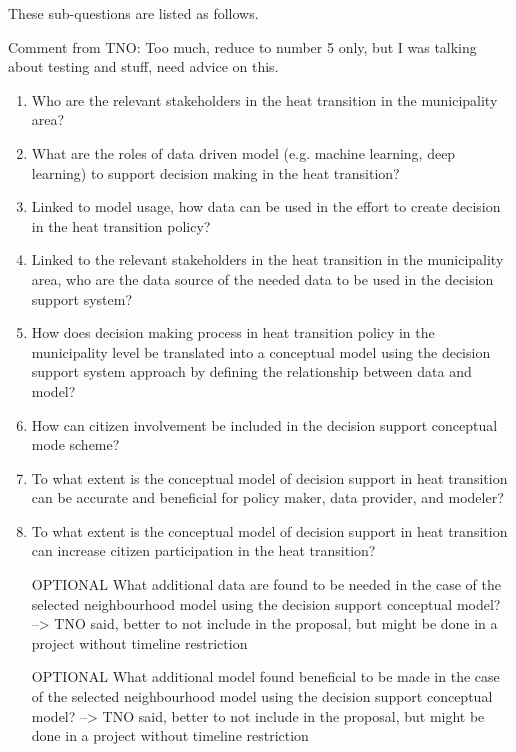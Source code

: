 These sub-questions are listed as follows.

Comment from TNO: Too much, reduce to number 5 only, but I was talking about testing and stuff, need advice on this.

\begin{enumerate}



    \item Who are the relevant stakeholders in the heat transition in the municipality area?
    \item What are the roles of data driven model (e.g. machine learning, deep learning) to support decision making in the heat transition?
    \item Linked to model usage, how data can be used in the effort to create decision in the heat transition policy?
    \item Linked to the relevant stakeholders in the heat transition in the municipality area, who are the data source of the needed data to be used in the decision support system?
    \item How does decision making process in heat transition policy in the municipality level be translated into a conceptual model using the decision support system approach by defining the relationship between data and model?
    \item How can citizen involvement be included in the decision support conceptual mode scheme? 
    \item To what extent is the conceptual model of decision support in heat transition can be accurate and beneficial for policy maker, data provider, and modeler?
    \item To what extent is the conceptual model of decision support in heat transition can increase citizen participation in the heat transition?
    
    \item [OPTIONAL] What additional data are found to be needed in the case of the selected neighbourhood model using the decision support conceptual model? --> TNO said, better to not include in the proposal, but might be done in a project without timeline restriction
    \item [OPTIONAL] What additional model found beneficial to be made in the case of the selected neighbourhood model using the decision support conceptual model? --> TNO said, better to not include in the proposal, but might be done in a project without timeline restriction

\end{enumerate}

